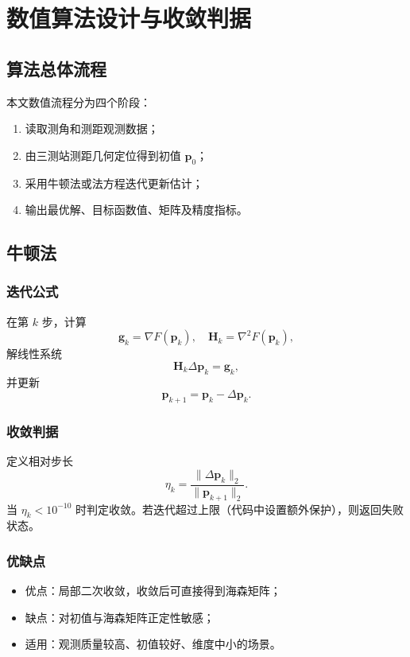 \chapter{数值算法设计与收敛判据}

\section{算法总体流程}
本文数值流程分为四个阶段：
\begin{enumerate}
  \item 读取测角和测距观测数据；
  \item 由三测站测距几何定位得到初值 $\bm p_0$；
  \item 采用牛顿法或法方程迭代更新估计；
  \item 输出最优解、目标函数值、矩阵及精度指标。
\end{enumerate}

\section{牛顿法}
\subsection{迭代公式}
在第 $k$ 步，计算
\[
\bm g_k=\nabla F(\bm p_k),\quad
\bm H_k=\nabla^2F(\bm p_k),
\]
解线性系统
\[
\bm H_k\Delta\bm p_k=\bm g_k,
\]
并更新
\[
\bm p_{k+1}=\bm p_k-\Delta\bm p_k.
\]

\subsection{收敛判据}
定义相对步长
\begin{equation}
\eta_k=\frac{\|\Delta\bm p_k\|_2}{\|\bm p_{k+1}\|_2}.
\end{equation}
当 $\eta_k<10^{-10}$ 时判定收敛。若迭代超过上限（代码中设置额外保护），则返回失败状态。

\subsection{优缺点}
\begin{itemize}
  \item 优点：局部二次收敛，收敛后可直接得到海森矩阵；
  \item 缺点：对初值与海森矩阵正定性敏感；
  \item 适用：观测质量较高、初值较好、维度中小的场景。
\end{itemize}

